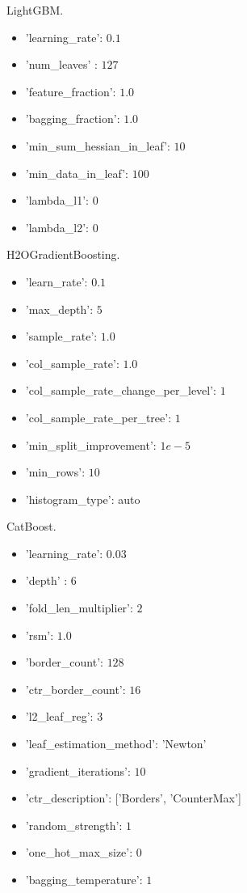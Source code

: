 \documentclass{article}
\begin{document}
\medskip
\noindent LightGBM.
\begin{itemize}
  \item 'learning\_rate': $0.1$
  \item 'num\_leaves' : $127$
  \item 'feature\_fraction': $1.0$
  \item 'bagging\_fraction': $1.0$
  \item 'min\_sum\_hessian\_in\_leaf': $10$
  \item 'min\_data\_in\_leaf': $100$
  \item 'lambda\_l1': $0$
  \item 'lambda\_l2': $0$
\end{itemize}

\medskip
\noindent H2OGradientBoosting.
\begin{itemize}
  \item 'learn\_rate':  $0.1$
  \item 'max\_depth': $5$
  \item 'sample\_rate': $1.0$
  \item 'col\_sample\_rate': $1.0$
  \item 'col\_sample\_rate\_change\_per\_level': $1$
  \item 'col\_sample\_rate\_per\_tree': $1$
  \item 'min\_split\_improvement': $1e-5$
  \item 'min\_rows': $10$
  \item 'histogram\_type': auto
\end{itemize}

\medskip
\noindent CatBoost.
\begin{itemize}
  \item 'learning\_rate': $0.03$
  \item 'depth' : $6$
  \item 'fold\_len\_multiplier': $2$
  \item 'rsm': $1.0$
  \item 'border\_count': $128$
  \item 'ctr\_border\_count': $16$
  \item 'l2\_leaf\_reg': $3$
  \item 'leaf\_estimation\_method': 'Newton'
  \item 'gradient\_iterations': $10$
  \item 'ctr\_description': ['Borders', 'CounterMax']
  \item 'random\_strength': $1$
  \item 'one\_hot\_max\_size': $0$
  \item 'bagging\_temperature': $1$
\end{itemize}
\end{document}
